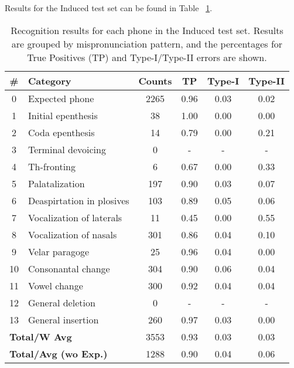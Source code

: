 \documentclass[twocolumn]{bmcart}%
\begin{document}
Results for the Induced test set can be found in Table ~\ref{rec-induced}.

\small
\begin{table}[ht!]
\caption{Recognition results for each phone in the Induced test set. Results are grouped by mispronunciation pattern, and the percentages for True Positives (TP) and Type-I/Type-II errors are shown.}
\setlength{\tabcolsep}{0.3em}
\begin{tabular}{clcccc} \hline
\textbf{\#} & \textbf{Category} & \textbf{Counts} & \textbf{TP} & \textbf{Type-I} & \textbf{Type-II} \\ \hline
0 & Expected phone & 2265 & 0.96 & 0.03 & 0.02 \\
1 & Initial epenthesis & 38 & 1.00 & 0.00 & 0.00 \\
2 & Coda epenthesis & 14 & 0.79 & 0.00 & 0.21 \\
3 & Terminal devoicing & 0 & - & - & - \\
4 & Th-fronting & 6 & 0.67 & 0.00 & 0.33 \\
5 & Palatalization & 197 & 0.90 & 0.03 & 0.07 \\
6 & Deaspirtation in plosives & 103 & 0.89 & 0.05 & 0.06 \\
7 & Vocalization of laterals & 11 & 0.45 & 0.00 & 0.55 \\
8 & Vocalization of nasals & 301 & 0.86 & 0.04 & 0.10 \\
9 & Velar paragoge & 25 & 0.96 & 0.04 & 0.00 \\
10 & Consonantal change & 304 & 0.90 & 0.06 & 0.04 \\
11 & Vowel change & 300 & 0.92 & 0.04 & 0.04 \\
12 & General deletion & 0 & - & - & - \\
13 & General insertion & 260 & 0.97 & 0.03 & 0.00 \\ \hline
\multicolumn{2}{l}{\textbf{Total/W Avg}} & 3553 & 0.93 & 0.03 & 0.03 \\ 
\multicolumn{2}{l}{\textbf{Total/Avg (wo Exp.)}} & 1288 & 0.90 & 0.04 & 0.06 \\  \hline
\end{tabular}
\label{rec-induced}
\end{table}
\normalsize
\end{document}
